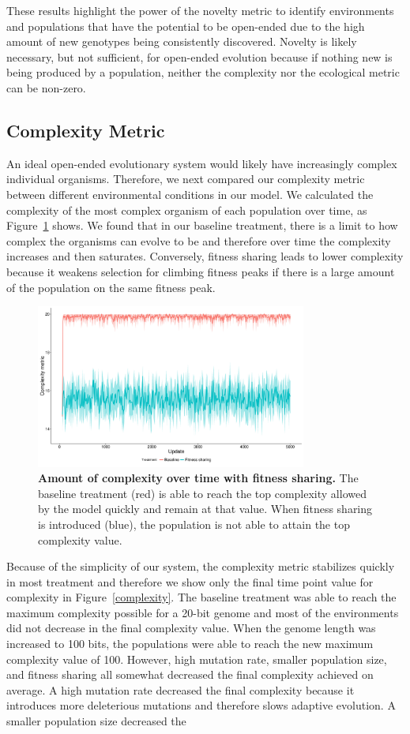 \documentclass[letterpaper]{article}
\begin{document}
These results highlight the power of the novelty metric to identify environments and populations that have the potential to be open-ended due to the high amount of new genotypes being consistently discovered. Novelty is likely necessary, but not sufficient, for open-ended evolution because if nothing new is being produced by a population, neither the complexity nor the ecological metric can be non-zero.

\subsection{Complexity Metric}
    An ideal open-ended evolutionary system would likely have increasingly complex individual organisms. Therefore, we next compared our complexity metric between different environmental conditions in our model. We calculated the complexity of the most complex organism of each population over time, as Figure~\ref{complexity_time} shows. We found that in our baseline treatment, there is a limit to how complex the organisms can evolve to be and therefore over time the complexity increases and then saturates. Conversely, fitness sharing leads to lower complexity because it weakens selection for climbing fitness peaks if there is a large amount of the population on the same fitness peak.

\begin{figure}
\includegraphics[width=3.5in]{figs/complexity_fitness_sharing.png}
\caption{\textbf{Amount of complexity over time with fitness sharing.} The baseline treatment (red) is able to reach the top complexity allowed by the model quickly and remain at that value. When fitness sharing is introduced (blue), the population is not able to attain the top complexity value.}
\label{complexity_time}
\end{figure}

Because of the simplicity of our system, the complexity metric stabilizes quickly in most treatment and therefore we show only the final time point value for complexity in Figure~\ref{complexity}. The baseline treatment was able to reach the maximum complexity possible for a 20-bit genome and most of the environments did not decrease in the final complexity value. When the genome length was increased to 100 bits, the populations were able to reach the new maximum complexity value of 100. However, high mutation rate, smaller population size, and fitness sharing all somewhat decreased the final complexity achieved on average. A high mutation rate decreased the final complexity because it introduces more deleterious mutations and therefore slows adaptive evolution. A smaller population size decreased the 
\end{document}
